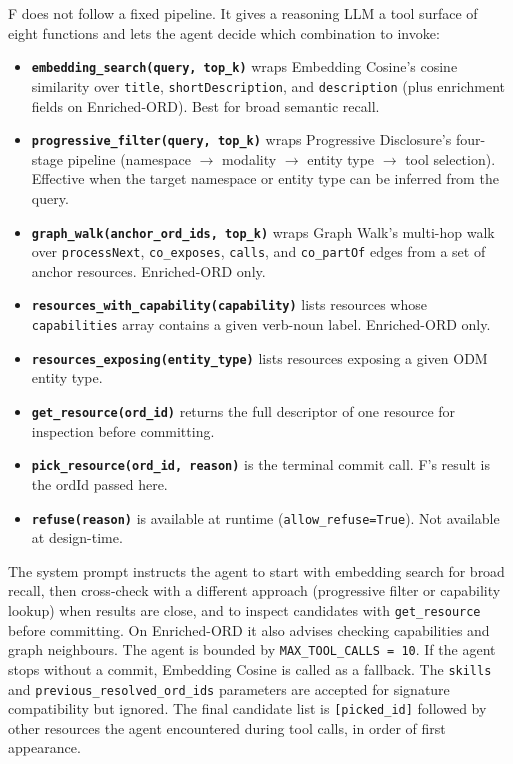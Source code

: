 F does not follow a fixed pipeline. It gives a reasoning LLM a tool surface of eight functions and lets the agent decide which combination to invoke:

\begin{itemize}
  \item \textbf{\texttt{embedding\_search(query, top\_k)}} wraps Embedding Cosine's cosine similarity over \texttt{title}, \texttt{shortDescription}, and \texttt{description} (plus enrichment fields on Enriched-ORD). Best for broad semantic recall.

  \item \textbf{\texttt{progressive\_filter(query, top\_k)}} wraps Progressive Disclosure's four-stage pipeline (namespace $\to$ modality $\to$ entity type $\to$ tool selection). Effective when the target namespace or entity type can be inferred from the query.

  \item \textbf{\texttt{graph\_walk(anchor\_ord\_ids, top\_k)}} wraps Graph Walk's multi-hop walk over \texttt{processNext}, \texttt{co\_exposes}, \texttt{calls}, and \texttt{co\_partOf} edges from a set of anchor resources. Enriched-ORD only.

  \item \textbf{\texttt{resources\_with\_capability(capability)}} lists resources whose \texttt{capabilities} array contains a given verb-noun label. Enriched-ORD only.

  \item \textbf{\texttt{resources\_exposing(entity\_type)}} lists resources exposing a given ODM entity type.

  \item \textbf{\texttt{get\_resource(ord\_id)}} returns the full descriptor of one resource for inspection before committing.

  \item \textbf{\texttt{pick\_resource(ord\_id, reason)}} is the terminal commit call. F's result is the ordId passed here.

  \item \textbf{\texttt{refuse(reason)}} is available at runtime (\texttt{allow\_refuse=True}). Not available at design-time.
\end{itemize}

The system prompt instructs the agent to start with embedding search for broad recall, then cross-check with a different approach (progressive filter or capability lookup) when results are close, and to inspect candidates with \texttt{get\_resource} before committing. On Enriched-ORD it also advises checking capabilities and graph neighbours. The agent is bounded by \texttt{MAX\_TOOL\_CALLS = 10}. If the agent stops without a commit, Embedding Cosine is called as a fallback. The \texttt{skills} and \texttt{previous\_resolved\_ord\_ids} parameters are accepted for signature compatibility but ignored. The final candidate list is \texttt{[picked\_id]} followed by other resources the agent encountered during tool calls, in order of first appearance.

